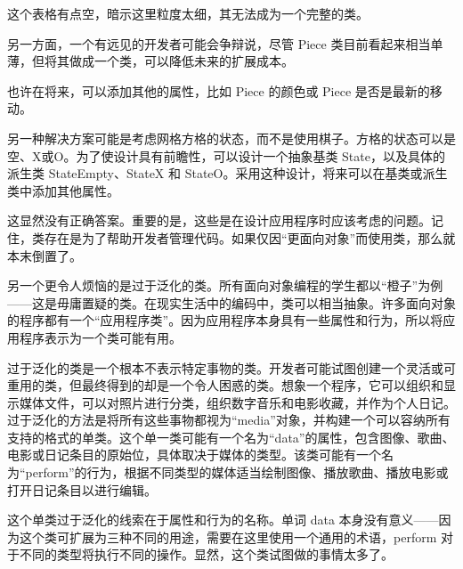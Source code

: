 这个表格有点空，暗示这里粒度太细，其无法成为一个完整的类。

另一方面，一个有远见的开发者可能会争辩说，尽管 Piece 类目前看起来相当单薄，但将其做成一个类，可以降低未来的扩展成本。

也许在将来，可以添加其他的属性，比如 Piece 的颜色或 Piece 是否是最新的移动。

另一种解决方案可能是考虑网格方格的状态，而不是使用棋子。方格的状态可以是空、X或O。为了使设计具有前瞻性，可以设计一个抽象基类 State，以及具体的派生类 StateEmpty、StateX 和 StateO。采用这种设计，将来可以在基类或派生类中添加其他属性。

这显然没有正确答案。重要的是，这些是在设计应用程序时应该考虑的问题。记住，类存在是为了帮助开发者管理代码。如果仅因“更面向对象”而使用类，那么就本末倒置了。


另一个更令人烦恼的是过于泛化的类。所有面向对象编程的学生都以“橙子”为例——这是毋庸置疑的类。在现实生活中的编码中，类可以相当抽象。许多面向对象的程序都有一个“应用程序类”。因为应用程序本身具有一些属性和行为，所以将应用程序表示为一个类可能有用。

过于泛化的类是一个根本不表示特定事物的类。开发者可能试图创建一个灵活或可重用的类，但最终得到的却是一个令人困惑的类。想象一个程序，它可以组织和显示媒体文件，可以对照片进行分类，组织数字音乐和电影收藏，并作为个人日记。过于泛化的方法是将所有这些事物都视为“media”对象，并构建一个可以容纳所有支持的格式的单类。这个单一类可能有一个名为“data”的属性，包含图像、歌曲、电影或日记条目的原始位，具体取决于媒体的类型。该类可能有一个名为“perform”的行为，根据不同类型的媒体适当绘制图像、播放歌曲、播放电影或打开日记条目以进行编辑。

这个单类过于泛化的线索在于属性和行为的名称。单词 data 本身没有意义——因为这个类可扩展为三种不同的用途，需要在这里使用一个通用的术语，perform 对于不同的类型将执行不同的操作。显然，这个类试图做的事情太多了。






















